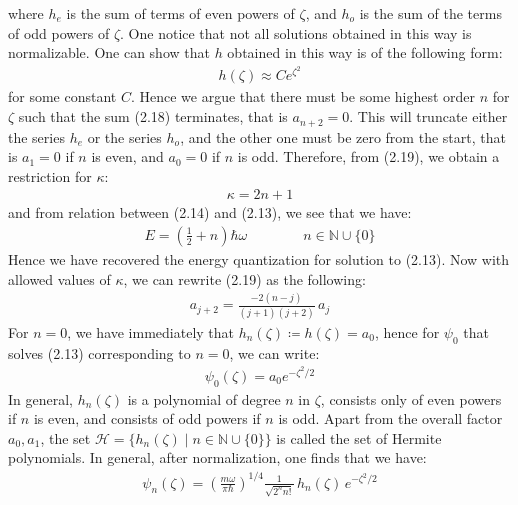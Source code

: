 \documentclass[11pt]{book}
\theoremstyle{break}
\theoremstyle{break}
\newcommand{\N}{\mathbb{N}}
\begin{document}
where $h_e$ is the sum of terms of even powers of $\zeta$, and $h_o$ is the sum of the terms of odd powers of $\zeta$. One notice that not all solutions obtained in this way is normalizable. One can show that $h$ obtained in this way is of the following form:
\begin{align*}
h(\zeta) \approx C e^{\zeta^2}
\end{align*}
for some constant $C$. Hence we argue that there must be some highest order $n$ for $\zeta$ such that the sum (2.18) terminates, that is $a_{n+2} = 0$. This will truncate either the series $h_e$ or the series $h_o$, and the other one must be zero from the start, that is $a_1 = 0$ if $n$ is even, and $a_0 = 0$ if $n$ is odd. Therefore, from (2.19), we obtain a restriction for $\kappa$:
\begin{align*}
\kappa = 2n+1
\end{align*}
and from relation between (2.14) and (2.13), we see that we have:
\begin{align*}
E = \left(\frac{1}{2}+n\right) \hbar \omega \qquad\qquad n \in \N\cup \{0\}
\end{align*}
Hence we have recovered the energy quantization for solution to (2.13). Now with allowed values of $\kappa$, we can rewrite (2.19) as the following:
\begin{align*}
a_{j+2} = \frac{-2(n-j)}{(j+1)(j+2)}\,a_j
\end{align*}
For $n=0$, we have immediately that $h_n(\zeta) \coloneqq h(\zeta) = a_0$, hence for $\psi_0$ that solves (2.13) corresponding to $n=0$, we can write:
\begin{align*}
\psi_0(\zeta)= a_0 e^{-\zeta^2/2}
\end{align*}
In general, $h_n(\zeta)$ is a polynomial of degree $n$ in $\zeta$, consists only of even powers if $n$ is even, and consists of odd powers if $n$ is odd. Apart from the overall factor $a_0,a_1$, the set $\mathcal{H} = \{h_n(\zeta)\mid n \in \N\cup\{0\}\}$ is called the set of Hermite polynomials. In general, after normalization, one finds that we have:
\begin{align*}
\psi_n(\zeta) = \left( \frac{m\omega}{\pi \hbar}\right)^{1/4} \frac{1}{\sqrt{2^n n!}}\, h_n(\zeta) \, e^{-\zeta^2/2} 
\end{align*}


\newpage
\end{document}
